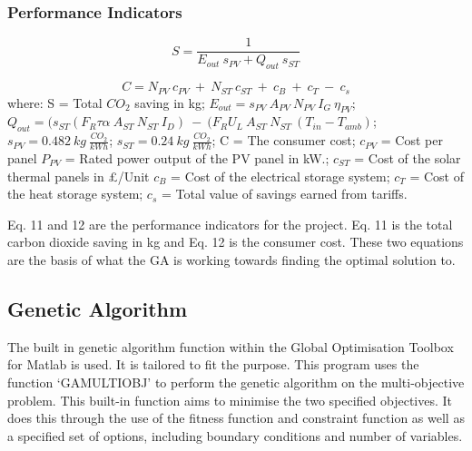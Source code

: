 \subsubsection{Performance Indicators}

\begin{equation}
S = \frac{1}{E_{out} \ s_{PV} + Q_{out} \ s_{ST}}
\end{equation}

\begin{equation}
C = N_{PV} \ c_{PV} \ + \ N_{ST} \ c_{ST} \ + \ c_B \ + \ c_T \ - \ c_s
\end{equation}
\newline
where: 
S = Total $CO_2$ saving in kg; \newline
$E_{out} = s_{PV} \ A_{PV} \ N_{PV} \ I_G  \ \eta_{PV}$;\newline
$Q_{out} = (s_{ST} (F_R \tau \alpha \ A_{ST} \ N_{ST} \ I_D ) \ - \ (F_R U_L \ A_{ST} \ N_{ST} \ (T_{in} - T_{amb})$; \newline
$s_{PV} = 0.482 \ kg \  \frac{CO_2}{kWh}$; \newline
$s_{ST} = 0.24 \ kg \ \frac{CO_2}{kWh}$; \newline
C = The consumer cost; \newline
$c_{PV}$ = Cost per panel \newline %
$P_{PV}$ = Rated power output of the PV panel in kW.; \newline %
$c_{ST}$ = Cost of the solar thermal panels in £/Unit \newline %
$c_B$ = Cost of the electrical storage system; \newline %
$c_T$ = Cost of the heat storage system; \newline %
$c_s$ = Total value of savings earned from tariffs. \newline

Eq. 11 and 12 are the performance indicators for the project. Eq. 11 is the total carbon dioxide saving in kg and Eq. 12 is the consumer cost. These two equations are the basis of what the GA is working towards finding the optimal solution to.

\subsection{Genetic Algorithm}

The built in genetic algorithm function within the Global Optimisation Toolbox for Matlab is used. It is tailored to fit the purpose. This program uses the function ‘GAMULTIOBJ’ \cite{GAMULTIOBJ} to perform the genetic algorithm on the multi-objective problem. This built-in function aims to minimise the two specified objectives. It does this through the use of the fitness function and constraint function as well as a specified set of options, including boundary conditions and number of variables.

